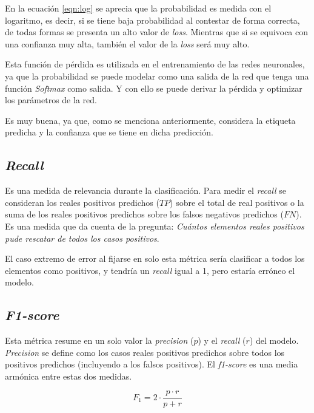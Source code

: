         En la ecuación \ref{eqn:log} se aprecia que la probabilidad es medida con el logaritmo, es decir, si se tiene baja probabilidad al contestar de forma correcta, de todas formas se presenta un alto valor de \textit{loss}. Mientras que si se equivoca con una confianza muy alta, también el valor de la \textit{loss} será muy alto.
        
        Esta función de pérdida es utilizada en el entrenamiento de las redes neuronales, ya que la probabilidad se puede modelar como una salida de la red que tenga una función \textit{Softmax} como salida. Y con ello se puede derivar la pérdida y optimizar los parámetros de la red.
        
        Es muy buena, ya que, como se menciona anteriormente, considera la etiqueta predicha y la confianza que se tiene en dicha predicción.
    
    \subsection{\textit{Recall}}
    
        Es una medida de relevancia durante la clasificación. Para medir el \textit{recall} se consideran los reales positivos predichos ($TP$) sobre el total de real positivos o la suma de los reales positivos predichos sobre los falsos negativos predichos ($FN$). Es una medida que da cuenta de la pregunta: \textit{Cuántos elementos reales positivos pude rescatar de todos los casos positivos}.
        
        El caso extremo de error al fijarse en solo esta métrica sería clasificar a todos los elementos como positivos, y tendría un \textit{recall} igual a 1, pero estaría erróneo el modelo.
    
    \subsection{\textit{F1-score}}
        
        Esta métrica resume en un solo valor la \textit{precision} ($p$) y el \textit{recall} ($r$) del modelo. \textit{Precision} se define como los casos reales positivos predichos sobre todos los positivos predichos (incluyendo a los falsos positivos). El \textit{f1-score} es una media armónica entre estas dos medidas.
        
        \begin{equation}
            F_1 = 2 \cdot \frac{p \cdot r}{p + r}
        \end{equation}
        

